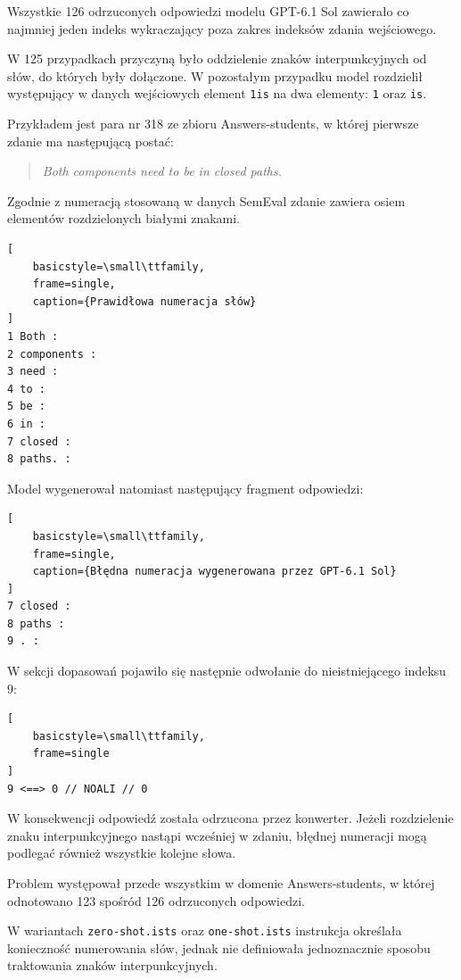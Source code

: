 \documentclass[a4paper,10pt]{article}
\begin{document}
Wszystkie 126 odrzuconych odpowiedzi modelu GPT-6.1 Sol
zawierało co najmniej jeden indeks wykraczający poza
zakres indeksów zdania wejściowego.

W 125 przypadkach przyczyną było oddzielenie znaków
interpunkcyjnych od słów, do których były dołączone.
W pozostałym przypadku model rozdzielił występujący
w danych wejściowych element \texttt{1is} na dwa
elementy: \texttt{1} oraz \texttt{is}.

Przykładem jest para nr 318 ze zbioru Answers-students,
w której pierwsze zdanie ma następującą postać:

\begin{quote}
    \textit{Both components need to be in closed paths.}
\end{quote}

Zgodnie z numeracją stosowaną w danych SemEval
zdanie zawiera osiem elementów rozdzielonych białymi
znakami.

\begin{lstlisting}[
    basicstyle=\small\ttfamily,
    frame=single,
    caption={Prawidłowa numeracja słów}
]
1 Both :
2 components :
3 need :
4 to :
5 be :
6 in :
7 closed :
8 paths. :
\end{lstlisting}

Model wygenerował natomiast następujący fragment
odpowiedzi:

\begin{lstlisting}[
    basicstyle=\small\ttfamily,
    frame=single,
    caption={Błędna numeracja wygenerowana przez GPT-6.1 Sol}
]
7 closed :
8 paths :
9 . :
\end{lstlisting}

W sekcji dopasowań pojawiło się następnie odwołanie
do nieistniejącego indeksu 9:

\begin{lstlisting}[
    basicstyle=\small\ttfamily,
    frame=single
]
9 <==> 0 // NOALI // 0
\end{lstlisting}

W konsekwencji odpowiedź została odrzucona przez
konwerter. Jeżeli rozdzielenie znaku interpunkcyjnego
nastąpi wcześniej w zdaniu, błędnej numeracji mogą
podlegać również wszystkie kolejne słowa.

Problem występował przede wszystkim w domenie
Answers-students, w której odnotowano 123 spośród
126 odrzuconych odpowiedzi.

W wariantach \texttt{zero-shot.ists} oraz
\texttt{one-shot.ists} instrukcja określała konieczność
numerowania słów, jednak nie definiowała jednoznacznie
sposobu traktowania znaków interpunkcyjnych.
\end{document}

